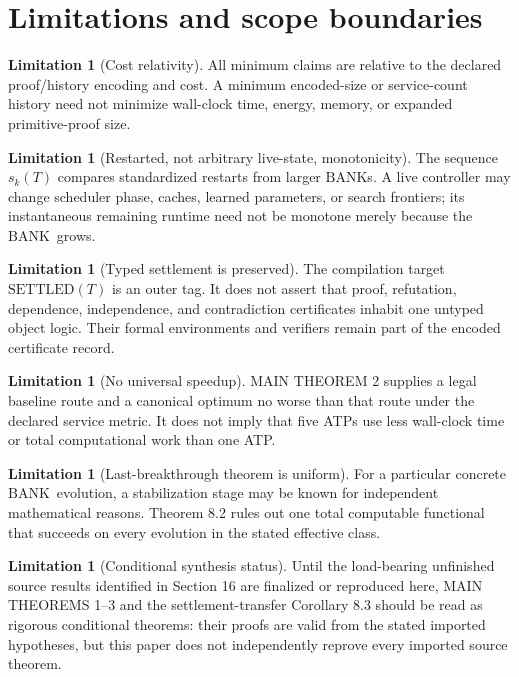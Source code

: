 \documentclass[11pt]{article}
\theoremstyle{definition}
\newtheorem{limitation}[theorem]{Limitation}
\newcommand{\BANK}{\ensuremath{\mathrm{BANK}}}
\newcommand{\SETTLED}{\ensuremath{\mathrm{SETTLED}}}
\begin{document}
\section{Limitations and scope boundaries}
\begin{limitation}[Cost relativity]
All minimum claims are relative to the declared proof/history encoding and cost. A minimum encoded-size or service-count history need not minimize wall-clock time, energy, memory, or expanded primitive-proof size.
\end{limitation}

\begin{limitation}[Restarted, not arbitrary live-state, monotonicity]
The sequence $s_k(T)$ compares standardized restarts from larger \BANK s. A live controller may change scheduler phase, caches, learned parameters, or search frontiers; its instantaneous remaining runtime need not be monotone merely because the \BANK\ grows.
\end{limitation}

\begin{limitation}[Typed settlement is preserved]
The compilation target $\SETTLED(T)$ is an outer tag. It does not assert that proof, refutation, dependence, independence, and contradiction certificates inhabit one untyped object logic. Their formal environments and verifiers remain part of the encoded certificate record.
\end{limitation}

\begin{limitation}[No universal speedup]
MAIN THEOREM 2 supplies a legal baseline route and a canonical optimum no worse than that route under the declared service metric. It does not imply that five ATPs use less wall-clock time or total computational work than one ATP.
\end{limitation}

\begin{limitation}[Last-breakthrough theorem is uniform]
For a particular concrete \BANK\ evolution, a stabilization stage may be known for independent mathematical reasons. Theorem 8.2 rules out one total computable functional that succeeds on every evolution in the stated effective class.
\end{limitation}

\begin{limitation}[Conditional synthesis status]
Until the load-bearing unfinished source results identified in Section 16 are finalized or reproduced here, MAIN THEOREMS 1--3 and the settlement-transfer Corollary 8.3 should be read as rigorous conditional theorems: their proofs are valid from the stated imported hypotheses, but this paper does not independently reprove every imported source theorem.
\end{limitation}
\end{document}
